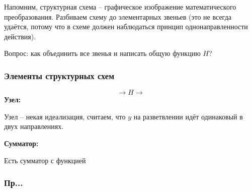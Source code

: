 \documentclass[main.tex]{subfiles}
\begin{document}
Напомним, структурная схема -- графическое изображение математического преобразования.
Разбиваем схему до элементарных звеньев (это не всегда удаётся, потому что в схеме должен наблюдаться принцип однонаправленности действия).

Вопрос: как объединить все звенья и написать общую функцию $ H $?

\subsubsection{Элементы структурных схем}

$$ \rightarrow \boxed{H} \rightarrow $$
\textbf{Узел:} %

Узел -- некая идеализация, считаем, что $ y $ на разветвлении идёт одинаковый в двух направлениях.

\textbf{Сумматор:} %

Есть сумматор с функцией

\subsubsection{Пр...} %


\subsubsection{}
\end{document}
